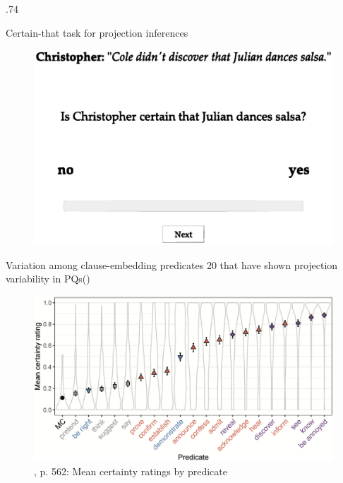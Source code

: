 \documentclass[final]{beamer}
\newlength{\colwidth}
\newlength{\vboxsep}
\begin{document}
\begin{frame}[t]
\begin{columns}[t]
\begin{column}{.74\colwidth}
\begin{normalbox}{Certain-that task for projection inferences}
				\begin{figure}[h]
					\centering
					\includegraphics[width=.6\linewidth]{task-1n-proj.eps}
					\label{fig:task}
				\end{figure}

				
			\end{normalbox}

			\vspace{\vboxsep}
			\begin{normalbox}{Variation among clause-embedding predicates}
				20  that have shown projection variability in PQs\newline (\citealt{degen_are_2022})

				\begin{figure}[h]
					\centering
					\includegraphics[width=.95\linewidth]{degen-tonhauser.png}
					\caption{\citealt{degen_are_2022}, p. 562: Mean certainty ratings by predicate}
					\label{fig:task}
				\end{figure}
				\vspace{-.8\baselineskip}
			\end{normalbox}


\end{column}
\end{columns}
\end{frame}
\end{document}
